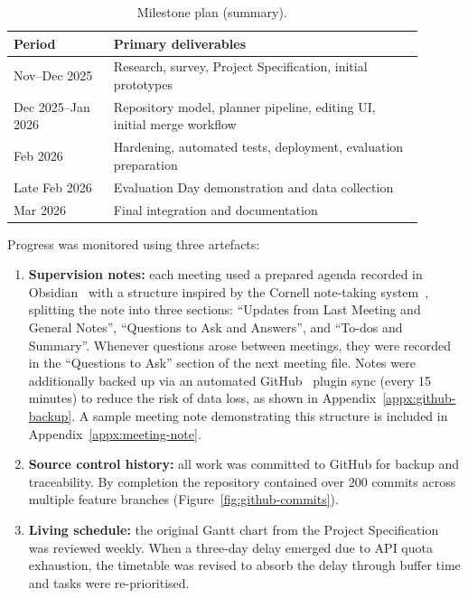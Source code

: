 \documentclass[pdftex,11pt,a4paper,oneside]{article}
\begin{document}
\begin{table}[H]
\centering
\caption{Milestone plan (summary).}
\label{tab:milestones}
\begin{tabular}{@{}p{0.22\linewidth}p{0.68\linewidth}@{}}
\toprule
\textbf{Period} & \textbf{Primary deliverables} \\
\midrule
Nov--Dec 2025  & Research, survey, Project Specification, initial prototypes \\
Dec 2025--Jan 2026 & Repository model, planner pipeline, editing UI, initial
                     merge workflow \\
Feb 2026       & Hardening, automated tests, deployment, evaluation preparation \\
Late Feb 2026  & Evaluation Day demonstration and data collection \\
Mar 2026       & Final integration and documentation \\
\bottomrule
\end{tabular}
\end{table}

Progress was monitored using three artefacts:
\begin{enumerate}
  \item \textbf{Supervision notes:} each meeting used a prepared agenda recorded
        in Obsidian~\cite{ref_obsidian} with a structure inspired by the Cornell note-taking
        system~\cite{ref_cornell}, splitting the note into three sections:
        ``Updates from Last Meeting and General Notes'', ``Questions to Ask and
        Answers'', and ``To-dos and Summary''. Whenever questions arose between
        meetings, they were recorded in the ``Questions to Ask'' section of the
        next meeting file. Notes were additionally backed up via an automated
        GitHub~\cite{ref_github} plugin sync (every 15 minutes) to reduce the risk of data loss,
        as shown in Appendix~\ref{appx:github-backup}. A sample meeting
        note demonstrating this structure is included in
        Appendix~\ref{appx:meeting-note}.
  \item \textbf{Source control history:} all work was committed to GitHub for
        backup and traceability. By completion the repository contained over
        200 commits across multiple feature branches
        (Figure~\ref{fig:github-commits}).
  \item \textbf{Living schedule:} the original Gantt chart from the Project
        Specification was reviewed weekly. When a three-day delay emerged due to
        API quota exhaustion, the timetable was revised to absorb the delay
        through buffer time and tasks were re-prioritised.
\end{enumerate}
\end{document}

